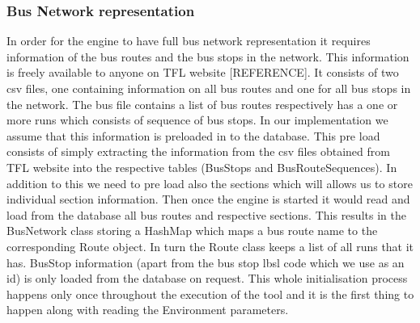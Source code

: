 \subsubsection{Bus Network representation}
In order for the engine to have full bus network representation it requires information of the bus routes and the bus stops in the network. This information is freely available to anyone on TFL website [REFERENCE]. It consists of two csv files, one containing information on all bus routes and one for all bus stops in the network. The bus file contains a list of bus routes respectively has a one or more runs which consists of sequence of bus stops.
In our implementation we assume that this information is preloaded in to the database. This pre load consists of simply extracting the information from the csv files obtained from TFL website into the respective tables (BusStops and BusRouteSequences). In addition to this we need to pre load also the sections which will allows us to store individual section information. Then once the engine is started it would read and load from the database all bus routes and respective sections. This results in the BusNetwork class storing a HashMap which maps a bus route name to the corresponding Route object. In turn the Route class keeps a list of all runs that it has. BusStop information (apart from the bus stop lbsl code which we use as an id) is only loaded from the database on request. This whole initialisation process happens only once throughout the execution of the tool and it is the first thing to happen along with reading the Environment parameters.

